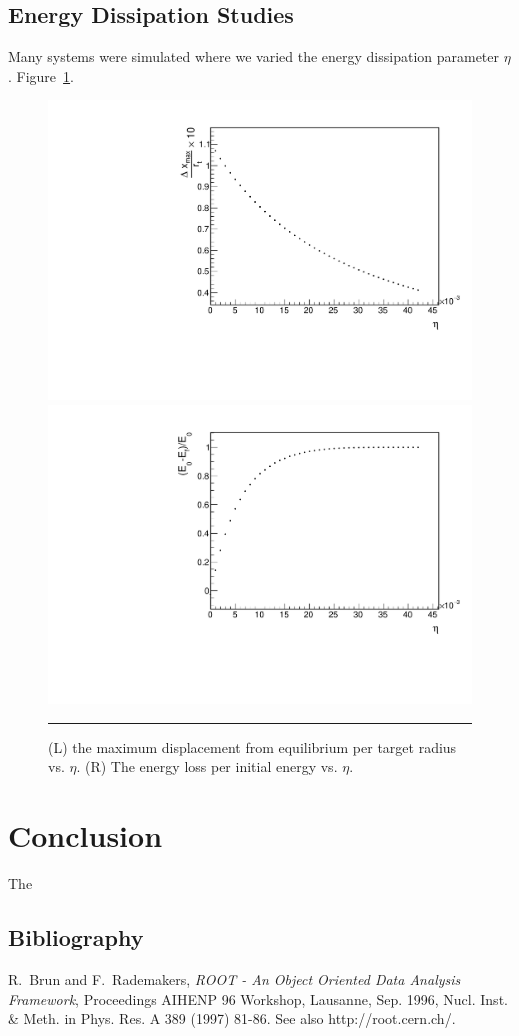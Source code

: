 \documentclass[aps,prl,floatfix,preprint,nofootinbib]{revtex4}
\begin{document}
\subsection{Energy Dissipation Studies}
Many systems were simulated where we varied the energy dissipation parameter $\eta$. Figure~\ref{fig:changing_eta}.
\begin{figure}[h!]
  \includegraphics[width=.45\linewidth]{plots/trend_plots/dxmax_vs_eta.pdf}
  \includegraphics[width=.45\linewidth]{plots/trend_plots/Eloss_vs_eta.pdf}
                  {\par\nobreak\rule[9pt]{35em}{0.5pt}\vspace{-5mm}}
                  \caption{(L) the maximum displacement from equilibrium per target radius vs. $\eta$. (R) The energy loss per initial energy vs. $\eta$.}
                  \label{fig:changing_eta}
\end{figure}


\section{Conclusion}
The

\clearpage
\begin{thebibliography}{9}
  \section{Bibliography}
  R.~Brun and F.~Rademakers, \emph{ROOT - An Object Oriented Data Analysis Framework}, Proceedings AIHENP 96 Workshop, Lausanne, Sep. 1996, Nucl. Inst. \& Meth. in Phys. Res. A 389 (1997) 81-86. See also http://root.cern.ch/.

\end{thebibliography}

\clearpage

\end{document}
